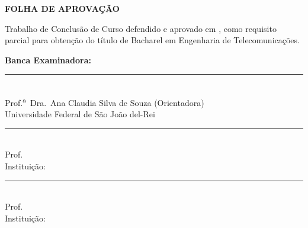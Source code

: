 \documentclass[12pt,a4paper]{article}
\begin{document}
\pagestyle{empty}
\begin{center}\textbf{FOLHA DE APROVAÇÃO}\end{center}
\vspace{1.5cm}
\noindent
Trabalho de Conclusão de Curso defendido e aprovado em
\underline{\hspace{4cm}}, como requisito parcial para obtenção do título de
Bacharel em Engenharia de Telecomunicações.

\vspace{2cm}
\noindent\textbf{Banca Examinadora:}

\vspace{1cm}
\noindent\rule{10cm}{0.4pt}\\
Prof.\textsuperscript{a}\ Dra.\ Ana Claudia Silva de Souza (Orientadora)\\
Universidade Federal de São João del-Rei

\vspace{0.8cm}
\noindent\rule{10cm}{0.4pt}\\
Prof.\ \underline{\hspace{6cm}}\\
Instituição: \underline{\hspace{5.2cm}}

\vspace{0.8cm}
\noindent\rule{10cm}{0.4pt}\\
Prof.\ \underline{\hspace{6cm}}\\
Instituição: \underline{\hspace{5.2cm}}

\newpage
\fi
\hypersetup{pageanchor=false}
\pagestyle{fancy}
\end{document}
